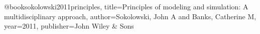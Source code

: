 \begin{thebibliography}{widest-label}

@book{sokolowski2011principles,
	title={Principles of modeling and simulation: A multidisciplinary approach},
	author={Sokolowski, John A and Banks, Catherine M},
	year={2011},
	publisher={John Wiley \& Sons}
}

\end{thebibliography}